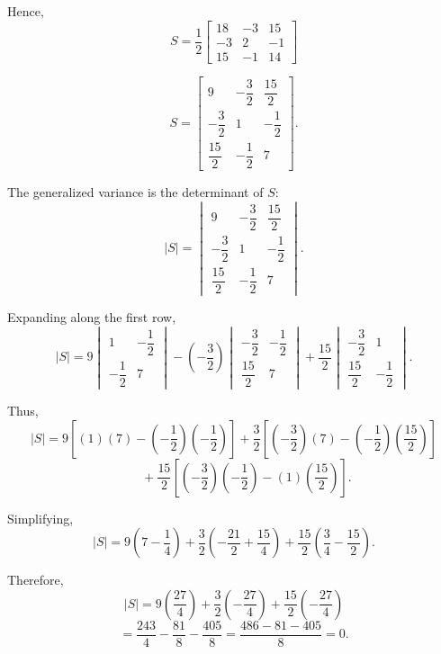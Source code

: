 \documentclass[12pt]{article}
\begin{document}
	Hence,
	\[
	S
	=
	\frac12
	\begin{bmatrix}
		18&-3&15\\
		-3&2&-1\\
		15&-1&14
	\end{bmatrix}
	\]
	
	\[
	\boxed{
		S=
		\begin{bmatrix}
			9&-\dfrac32&\dfrac{15}{2}\\[5pt]
			-\dfrac32&1&-\dfrac12\\[5pt]
			\dfrac{15}{2}&-\dfrac12&7
	\end{bmatrix}}.
	\]
	
	The generalized variance is the determinant of \(S\):
	\[
	|S|
	=
	\begin{vmatrix}
		9&-\dfrac32&\dfrac{15}{2}\\[5pt]
		-\dfrac32&1&-\dfrac12\\[5pt]
		\dfrac{15}{2}&-\dfrac12&7
	\end{vmatrix}.
	\]
	
	Expanding along the first row,
	\[
	|S|
	=
	9
	\begin{vmatrix}
		1&-\dfrac12\\[3pt]
		-\dfrac12&7
	\end{vmatrix}
	-
	\left(-\frac32\right)
	\begin{vmatrix}
		-\dfrac32&-\dfrac12\\[3pt]
		\dfrac{15}{2}&7
	\end{vmatrix}
	+
	\frac{15}{2}
	\begin{vmatrix}
		-\dfrac32&1\\[3pt]
		\dfrac{15}{2}&-\dfrac12
	\end{vmatrix}.
	\]
	
	Thus,
	\[
	|S|
	=
	9
	\left[
	(1)(7)
	-
	\left(-\frac12\right)
	\left(-\frac12\right)
	\right]
	+
	\frac32
	\left[
	\left(-\frac32\right)(7)
	-
	\left(-\frac12\right)
	\left(\frac{15}{2}\right)
	\right]
	\]
	\[
	\qquad
	+
	\frac{15}{2}
	\left[
	\left(-\frac32\right)
	\left(-\frac12\right)
	-
	(1)\left(\frac{15}{2}\right)
	\right].
	\]
	
	Simplifying,
	\[
	|S|
	=
	9\left(7-\frac14\right)
	+
	\frac32
	\left(-\frac{21}{2}+\frac{15}{4}\right)
	+
	\frac{15}{2}
	\left(\frac34-\frac{15}{2}\right).
	\]
	
	Therefore,
	\[
	|S|
	=
	9\left(\frac{27}{4}\right)
	+
	\frac32\left(-\frac{27}{4}\right)
	+
	\frac{15}{2}\left(-\frac{27}{4}\right)
	\]
	\[
	=
	\frac{243}{4}
	-
	\frac{81}{8}
	-
	\frac{405}{8}
	=
	\frac{486-81-405}{8}
	=
	0.
	\]
	
\end{document}
